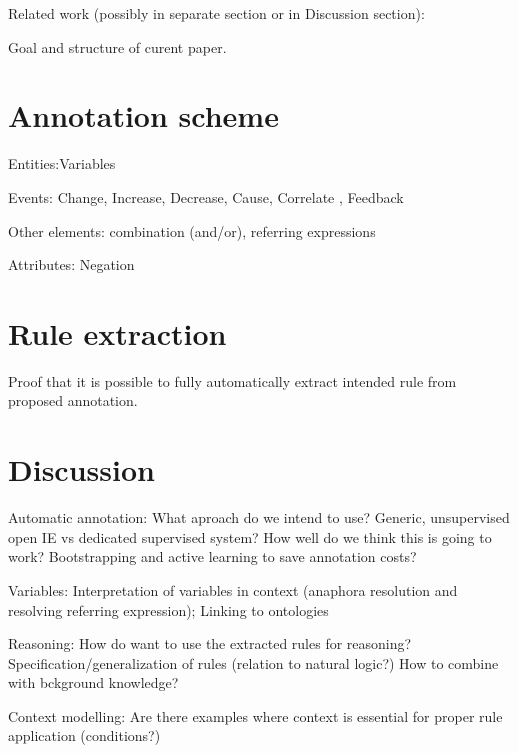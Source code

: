 \documentclass[10pt, a4paper]{article}
\begin{document}
Related work (possibly in separate section or in Discussion section):
\cite{Hashimoto2012Excitatory}
\cite{Mihaila2013BioCause}
\cite{Zambach2010Lexical}
\cite{Vossen2008}


Goal and structure of curent paper.


\section{Annotation scheme}

Entities:Variables

Events: Change, Increase, Decrease, Cause, Correlate , Feedback

Other elements: combination (and/or), referring expressions

Attributes: Negation

\section{Rule extraction}

Proof that it is possible to fully automatically extract intended rule from proposed annotation. 

\section{Discussion}

Automatic annotation:
What aproach do we intend to use?
Generic, unsupervised open IE vs dedicated supervised system?
How well do we think this is going to work?
Bootstrapping and active learning to save annotation costs?

Variables:
Interpretation of variables in context (anaphora resolution and resolving referring expression);
Linking to ontologies

Reasoning:
How do want to use the extracted rules for reasoning?
Specification/generalization of rules (relation to natural logic?)
How to combine with bckground knowledge?

Context modelling:
Are there examples where context is essential for proper rule application (conditions?)
\end{document}
